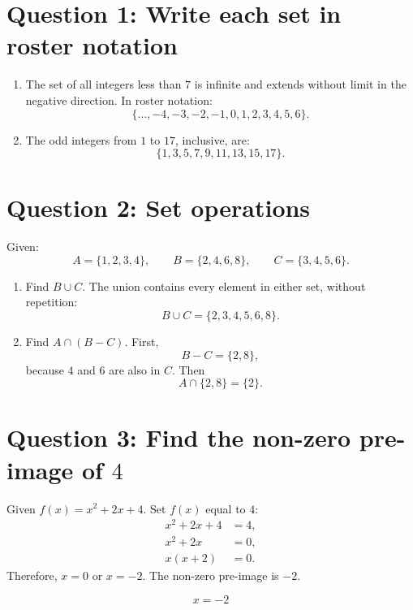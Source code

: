 \documentclass[11pt]{article}
\title{}
\author{}
\date{}
\begin{document}
\maketitle

\section*{Question 1: Write each set in roster notation}

\begin{enumerate}
    \item[(a)] The set of all integers less than \(7\) is infinite and extends without limit in the negative direction. In roster notation:
    \[
    \{\ldots,-4,-3,-2,-1,0,1,2,3,4,5,6\}.
    \]
    \item[(b)] The odd integers from \(1\) to \(17\), inclusive, are:
    \[
    \{1,3,5,7,9,11,13,15,17\}.
    \]
\end{enumerate}

\section*{Question 2: Set operations}

Given:
\[
A=\{1,2,3,4\},\qquad
B=\{2,4,6,8\},\qquad
C=\{3,4,5,6\}.
\]

\begin{enumerate}
    \item[(a)] Find \(B\cup C\). The union contains every element in either set, without repetition:
    \[
    B\cup C=\{2,3,4,5,6,8\}.
    \]
    \item[(b)] Find \(A\cap(B-C)\). First,
    \[
    B-C=\{2,8\},
    \]
    because \(4\) and \(6\) are also in \(C\). Then
    \[
    A\cap\{2,8\}=\{2\}.
    \]
\end{enumerate}

\section*{Question 3: Find the non-zero pre-image of \(4\)}

Given \(f(x)=x^2+2x+4\). Set \(f(x)\) equal to \(4\):
\begin{align*}
x^2+2x+4 &= 4,\\
x^2+2x &= 0,\\
x(x+2) &= 0.
\end{align*}
Therefore, \(x=0\) or \(x=-2\). The non-zero pre-image is \(-2\).

\[
\boxed{x=-2}
\]
\end{document}

